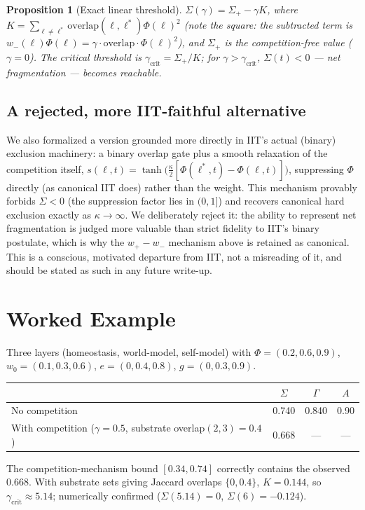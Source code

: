\documentclass[11pt]{article}
\newtheorem{proposition}{Proposition}
\begin{document}
\begin{proposition}[Exact linear threshold]
$\Sigma(\gamma) = \Sigma_+ - \gamma K$, where $K=\sum_{\ell\neq\ell^*}\text{overlap}(\ell,\ell^*)\Phi(\ell)^2$ (note the square: the subtracted term is $w_-(\ell)\Phi(\ell)=\gamma\cdot\text{overlap}\cdot\Phi(\ell)^2$), and $\Sigma_+$ is the competition-free value ($\gamma=0$). The critical threshold is $\gamma_{\text{crit}}=\Sigma_+/K$; for $\gamma>\gamma_{\text{crit}}$, $\Sigma(t)<0$ --- net fragmentation --- becomes reachable.
\end{proposition}

\subsection*{A rejected, more IIT-faithful alternative}
We also formalized a version grounded more directly in IIT's actual (binary) exclusion machinery: a binary overlap gate plus a smooth relaxation of the competition itself, $s(\ell,t)=\tanh\!\big(\tfrac{\kappa}{2}[\Phi(\ell^*,t)-\Phi(\ell,t)]\big)$, suppressing $\Phi$ directly (as canonical IIT does) rather than the weight. This mechanism provably forbids $\Sigma<0$ (the suppression factor lies in $(0,1]$) and recovers canonical hard exclusion exactly as $\kappa\to\infty$. We deliberately reject it: the ability to represent net fragmentation is judged more valuable than strict fidelity to IIT's binary postulate, which is why the $w_+-w_-$ mechanism above is retained as canonical. This is a conscious, motivated departure from IIT, not a misreading of it, and should be stated as such in any future write-up.

\section{Worked Example}\label{sec:example}

Three layers (homeostasis, world-model, self-model) with $\Phi=(0.2,0.6,0.9)$, $w_0=(0.1,0.3,0.6)$, $e=(0,0.4,0.8)$, $g=(0,0.3,0.9)$.

\begin{center}
\begin{tabular}{@{}lccc@{}}
\toprule
& $\Sigma$ & $\Gamma$ & $A$ \\
\midrule
No competition & 0.740 & 0.840 & 0.90 \\
With competition ($\gamma=0.5$, substrate overlap$(2,3)=0.4$) & 0.668 & --- & --- \\
\bottomrule
\end{tabular}
\end{center}
The competition-mechanism bound $[0.34,0.74]$ correctly contains the observed 0.668. With substrate sets giving Jaccard overlaps $\{0,0.4\}$, $K=0.144$, so $\gamma_{\text{crit}}\approx5.14$; numerically confirmed ($\Sigma(5.14)=0$, $\Sigma(6)=-0.124$).
\end{document}
